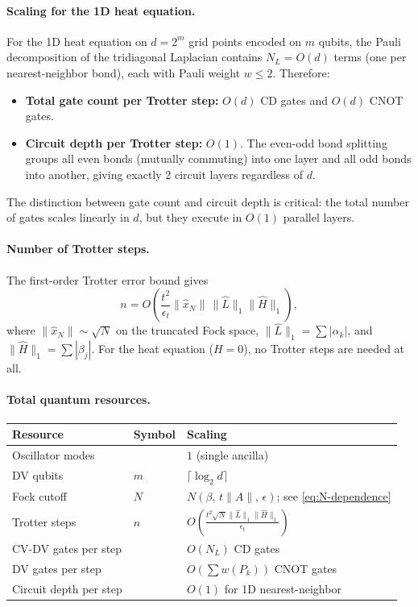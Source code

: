 \documentclass[11pt]{article}
\begin{document}
\paragraph{Scaling for the 1D heat equation.}
For the 1D heat equation on $d = 2^m$ grid points encoded on $m$ qubits,
the Pauli decomposition of the tridiagonal Laplacian contains
$N_L = O(d)$ terms (one per nearest-neighbor bond), each with Pauli weight
$w \leq 2$.  Therefore:
\begin{itemize}
  \item \textbf{Total gate count per Trotter step:} $O(d)$ CD gates and
        $O(d)$ CNOT gates.
  \item \textbf{Circuit depth per Trotter step:} $O(1)$.
        The even-odd bond splitting~\cite[Eq.~49--51]{das2025} groups all
        even bonds (mutually commuting) into one layer and all odd bonds
        into another, giving exactly 2 circuit layers regardless of $d$.
\end{itemize}
The distinction between gate count and circuit depth is critical:
the total number of gates scales linearly in $d$, but they execute in
$O(1)$ parallel layers.

\paragraph{Number of Trotter steps.}
The first-order Trotter error bound gives
\begin{equation}
  n = O\!\left(\frac{t^2}{\epsilon_t}\|\hat{x}_N\|\,
  \|\hat{L}\|_1\|\hat{H}\|_1\right),
\end{equation}
where $\|\hat{x}_N\| \sim \sqrt{N}$ on the truncated Fock space,
$\|\hat{L}\|_1 = \sum|\alpha_k|$, and $\|\hat{H}\|_1 = \sum|\beta_j|$.
For the heat equation ($H=0$), no Trotter steps are needed at all.

\paragraph{Total quantum resources.}
\begin{center}
\begin{tabular}{lll}
  \toprule
  Resource & Symbol & Scaling \\
  \midrule
  Oscillator modes & & $1$ (single ancilla) \\
  DV qubits & $m$ & $\lceil\log_2 d\rceil$ \\
  Fock cutoff & $N$ & $N(\beta,\,t\|A\|,\,\epsilon)$;
  see \cref{eq:N-dependence} \\
  Trotter steps & $n$ & $O\!\left(\frac{t^2\sqrt{N}\|\hat{L}\|_1
  \|\hat{H}\|_1}{\epsilon_t}\right)$ \\
  CV-DV gates per step & & $O(N_L)$ CD gates \\
  DV gates per step & & $O(\sum w(P_k))$ CNOT gates \\
  Circuit depth per step & & $O(1)$ for 1D nearest-neighbor \\
  \bottomrule
\end{tabular}
\end{center}
\end{document}

